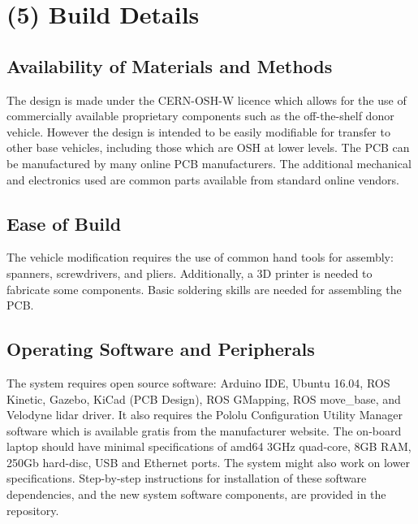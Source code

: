 \documentclass[a4paper]{article}
\begin{document}
	
	
	\section{(5) Build Details}\label{h.l8i9vokvs0bj}
	
	\subsection{Availability of Materials and Methods}\label{h.60suejv0jlzi}
	
	The design is made under the CERN-OSH-W licence which allows for the use of commercially available proprietary components such as the off-the-shelf donor vehicle. However the design is intended to be easily modifiable for transfer to other base vehicles, including those which are OSH at lower levels. The PCB can be manufactured by many online PCB manufacturers. The additional mechanical and electronics used are common parts available from standard online vendors. 
	
	\subsection{Ease of Build}\label{h.wg823sgyb1e4}
	
	
	The vehicle modification requires the use of common hand tools for assembly: spanners, screwdrivers, and pliers. Additionally, a 3D printer is needed to fabricate some components. Basic soldering skills are needed for assembling the PCB. 
	
	\subsection{Operating Software and Peripherals}\label{h.uz77dixfh5i4}
	
	The system requires open source software: Arduino IDE, Ubuntu 16.04, ROS Kinetic, Gazebo, KiCad (PCB Design), ROS GMapping, ROS move\_base, and Velodyne lidar driver. It also requires the Pololu Configuration Utility Manager software which is available gratis from the manufacturer website. The on-board laptop should have minimal specifications of amd64 3GHz quad-core, 8GB RAM, 250Gb hard-disc, USB and Ethernet ports. The system might also work on lower specifications. Step-by-step instructions for installation of these software dependencies, and the new system software components, are provided in the repository.
	
\end{document}
